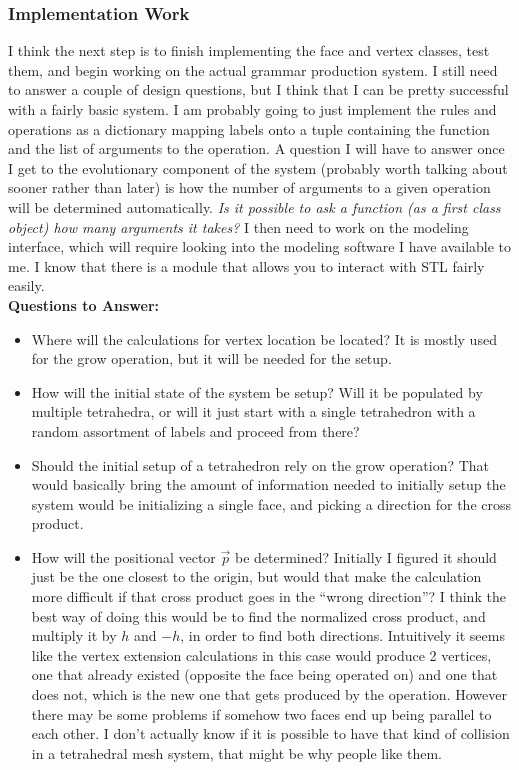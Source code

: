 \documentclass[letterpaper,oneside,titlepage]{article}
\begin{document}
\subsubsection*{Implementation Work}
I think the next step is to finish implementing the face and vertex classes, test them, and begin working on the actual grammar production system.  I still need to answer a couple of design questions, but I think that I can be pretty successful with a fairly basic system.  I am probably going to just implement the rules and operations as a dictionary mapping labels onto a tuple containing the function and the list of arguments to the operation.  A question I will have to answer once I get to the evolutionary component of the system (probably worth talking about sooner rather than later) is how the number of arguments to a given operation will be determined automatically.  \emph{Is it possible to ask a function (as a first class object) how many arguments it takes?}  I then need to work on the modeling interface, which will require looking into the modeling software I have available to me.  I know that there is a module that allows you to interact with STL fairly easily.
\\
\textbf{Questions to Answer:}
\\
\begin{itemize}
\item Where will the calculations for vertex location be located?  It is mostly used for the grow operation, but it will be needed for the setup.
\item How will the initial state of the system be setup?  Will it be populated by multiple tetrahedra, or will it just start with a single tetrahedron with a random assortment of labels and proceed from there?
\item Should the initial setup of a tetrahedron rely on the grow operation?  That would basically bring the amount of information needed to initially setup the system would be initializing a single face, and picking a direction for the cross product.
\item How will the positional vector $\vec{p}$ be determined?  Initially I figured it should just be the one closest to the origin, but would that make the calculation more difficult if that cross product goes in the ``wrong direction''?  I think the best way of doing this would be to find the normalized cross product, and multiply it by $h$ and $-h$, in order to find both directions.  Intuitively it seems like the vertex extension calculations in this case would produce 2 vertices, one that already existed (opposite the face being operated on) and one that does not, which is the new one that gets produced by the operation.  However there may be some problems if somehow two faces end up being parallel to each other.  I don't actually know if it is possible to have that kind of collision in a tetrahedral mesh system, that might be why people like them.
\end{itemize}
\end{document}
